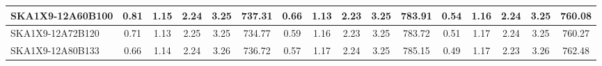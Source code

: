 \begin{table}[H]
{{\begin{tabular}{|lccccc||ccccc||ccccc|}
SKA1X9-12A60B100 & 0.81 \cellcolor{blue!46.68} & 1.15 \cellcolor{red!29.24} & 2.24 \cellcolor{green!48.98} & 3.25 \cellcolor{orange!18.00} & 737.31 \cellcolor{purple!30.50} & 0.66 \cellcolor{blue!44.46} & 1.13 \cellcolor{red!18.00} & 2.23 \cellcolor{green!42.37} & 3.25 \cellcolor{orange!41.80} & 783.91 \cellcolor{purple!19.57} & 0.54 \cellcolor{blue!50.01} & 1.16 \cellcolor{red!33.24} & 2.24 \cellcolor{green!60.00} & 3.25 \cellcolor{orange!31.08} & 760.08 \cellcolor{purple!18.00}\\ \hline 
SKA1X9-12A72B120 & 0.71 \cellcolor{blue!27.84} & 1.13 \cellcolor{red!18.00} & 2.25 \cellcolor{green!60.00} & 3.25 \cellcolor{orange!27.08} & 734.77 \cellcolor{purple!18.00} & 0.59 \cellcolor{blue!23.59} & 1.16 \cellcolor{red!37.40} & 2.23 \cellcolor{green!32.52} & 3.25 \cellcolor{orange!32.93} & 783.72 \cellcolor{purple!18.00} & 0.51 \cellcolor{blue!34.08} & 1.17 \cellcolor{red!53.23} & 2.24 \cellcolor{green!58.16} & 3.25 \cellcolor{orange!18.00} & 760.27 \cellcolor{purple!21.38}\\ \hline 
SKA1X9-12A80B133 & 0.66 \cellcolor{blue!18.00} & 1.14 \cellcolor{red!20.66} & 2.24 \cellcolor{green!36.77} & 3.26 \cellcolor{orange!49.22} & 736.72 \cellcolor{purple!27.60} & 0.57 \cellcolor{blue!18.00} & 1.17 \cellcolor{red!45.22} & 2.24 \cellcolor{green!60.00} & 3.25 \cellcolor{orange!44.13} & 785.15 \cellcolor{purple!29.65} & 0.49 \cellcolor{blue!18.00} & 1.17 \cellcolor{red!47.98} & 2.23 \cellcolor{green!18.00} & 3.26 \cellcolor{orange!60.00} & 762.48 \cellcolor{purple!60.00}\\ \hline 
\end{tabular}}
\vspace{-0.300000cm}
\hspace{1cm} 
}
\end{table}
